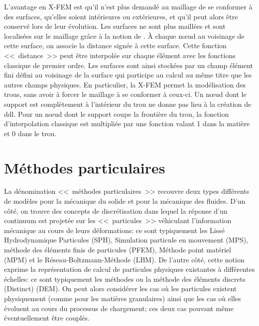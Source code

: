 \medskip
L'avantage en X-FEM est qu'il n'est plus demandé au maillage de se conformer à des surfaces, qu'elles soient intérieures ou extérieures, et qu'il peut alors être conservé lors de leur évolution. Les surfaces ne sont plus maillées et sont localisées sur le maillage grâce à la notion de . À chaque nœud au voisinage de cette surface, on associe la distance signée à cette surface. Cette fonction <<~distance~>> peut être interpolée sur chaque élément avec les fonctions classique de premier ordre. Les surfaces sont ainsi stockées par un champ élément fini défini au voisinage de la surface qui participe au calcul au même titre que les autres champs physiques. En particulier, la X-FEM permet la modélisation des trous, sans avoir à forcer le maillage à se conformer à ceux-ci. Un nœud dont le support est complètement à l'intérieur du trou ne donne pas lieu à la création de ddl. Pour un nœud dont le support coupe la frontière du trou, la fonction d'interpolation classique est multipliée par une fonction valant 1 dans la matière et 0 dans le trou.

\medskip
\section{Méthodes particulaires}\label{Sec-PBM}
La dénomination <<~méthodes particulaires~>> recouvre deux types différents de modèles pour la mécanique du solide et pour la mécanique des fluides. D'un côté, on trouve des concepts de discrétisation dans lequel la réponse d'un continuum est projetée sur les <<~particules~>> véhiculant l'information mécanique au cours de leurs déformations: ce sont typiquement les  Lissé Hydrodynamique Particules (SPH), Simulation particule en mouvement (MPS), méthode des éléments finis de particules (PFEM), Méthode point matériel (MPM) et le Réseau-Boltzmann-Méthode (LBM). De l'autre côté, cette notion exprime la représentation de calcul de particules physiques existantes à différentes échelles: ce sont typiquement les méthodes  ou la méthode des éléments discrets (Distinct) (DEM). On peut alors considérer les cas où les particules existent physiquement (comme pour les matières granulaires) ainsi que les cas où elles évoluent au cours du processus de chargement; ces deux cas pouvant même éventuellement être couplés.

